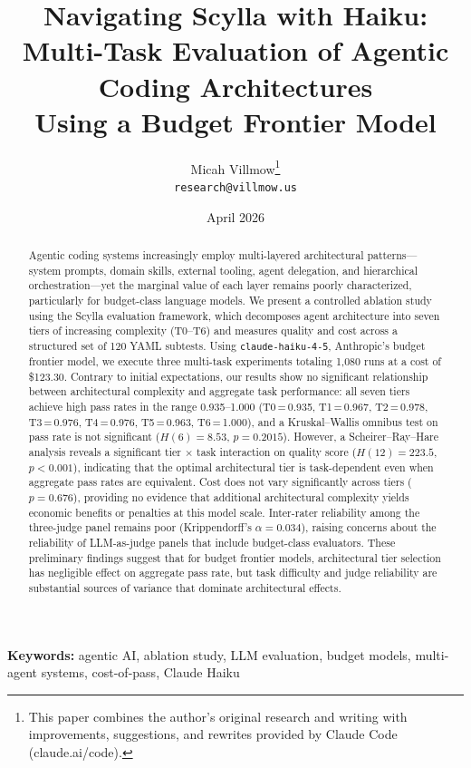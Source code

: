 \documentclass[11pt]{article}
\title{Navigating Scylla with Haiku:\\Multi-Task Evaluation of Agentic Coding Architectures\\Using a Budget Frontier Model}
\author{
  Micah Villmow\thanks{This paper combines the author's original research
  and writing with improvements, suggestions, and rewrites provided by
  Claude Code (claude.ai/code).} \\
  \texttt{research@villmow.us}
}
\date{April 2026}
\begin{document}
\maketitle

\begin{abstract}
Agentic coding systems increasingly employ multi-layered architectural
patterns---system prompts, domain skills, external tooling, agent delegation,
and hierarchical orchestration---yet the marginal value of each layer remains
poorly characterized, particularly for budget-class language models. We present
a controlled ablation study using the Scylla evaluation framework, which
decomposes agent architecture into seven tiers of increasing complexity
(T0--T6) and measures quality and cost across a structured set of 120 YAML
subtests. Using \texttt{claude-haiku-4-5}, Anthropic's budget frontier model,
we execute three multi-task experiments totaling 1,080 runs at a cost of
\$123.30. Contrary to initial expectations, our results show no significant
relationship between architectural complexity and aggregate task performance:
all seven tiers achieve high pass rates in the range 0.935--1.000
(T0\,=\,0.935, T1\,=\,0.967, T2\,=\,0.978, T3\,=\,0.976, T4\,=\,0.976,
T5\,=\,0.963, T6\,=\,1.000), and a Kruskal--Wallis omnibus test on pass rate
is not significant ($H(6)=8.53$, $p=0.2015$). However, a
Scheirer--Ray--Hare analysis reveals a significant tier $\times$ task
interaction on quality score ($H(12)=223.5$, $p<0.001$), indicating that the
optimal architectural tier is task-dependent even when aggregate pass rates are
equivalent. Cost does not vary significantly across tiers ($p=0.676$),
providing no evidence that additional architectural complexity yields economic
benefits or penalties at this model scale. Inter-rater reliability among the
three-judge panel remains poor (Krippendorff's $\alpha=0.034$), raising
concerns about the reliability of LLM-as-judge panels that include
budget-class evaluators. These preliminary findings suggest that for budget
frontier models, architectural tier selection has negligible effect on
aggregate pass rate, but task difficulty and judge reliability are substantial
sources of variance that dominate architectural effects.
\end{abstract}

\textbf{Keywords:} agentic AI, ablation study, LLM evaluation, budget models,
multi-agent systems, cost-of-pass, Claude Haiku
\end{document}
